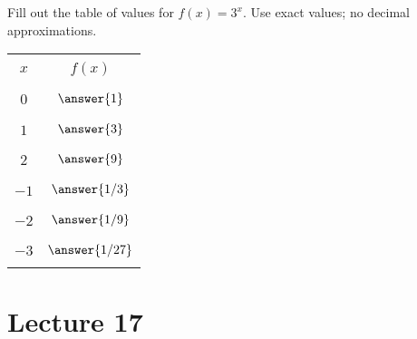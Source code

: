 \documentclass{ximera}
\begin{document}
\begin{problem}\label{prob:160hom7prob3}
Fill out the table of values for $f(x)=3^x$.  Use exact values; no decimal approximations.
\begin{center}
\begin{tabular}{|c|c|}
 \hline
 &   \\
 $x$& $f(x)$ \\
 &  \\
  \hline
  &  \\
 $0$ & $\answer{1}$ \\
  & \\
 \hline
  & \\
 $1$ & $\answer{3}$ \\
  & \\
 \hline
  & \\
  $2$ & $\answer{9}$  \\
  & \\
 \hline
 & \\
  $-1$ & $\answer{1/3}$  \\
  & \\
 \hline
 & \\
  $-2$ & $\answer{1/9}$  \\
  & \\
 \hline
 & \\
  $-3$ & $\answer{1/27}$  \\
  & \\
 \hline
 \end{tabular}
\end{center}    
\end{problem}

\section{Lecture 17}
 
\end{document}
